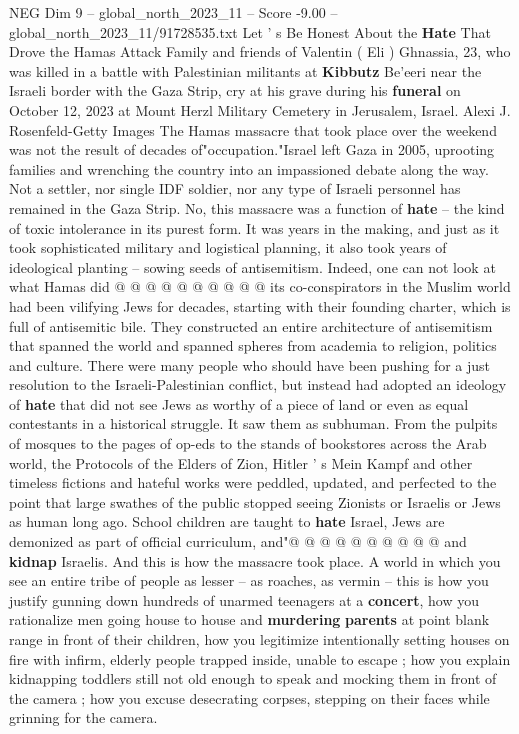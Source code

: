 \begin{textsample}{NEG Dim 9 – global\_north\_2023\_11 – Score -9.00 – global\_north\_2023\_11/91728535.txt}  \label{ex:f9_neg_068}
Let ' s Be Honest About the \textbf{Hate} That Drove the Hamas Attack Family and friends of Valentin ( Eli ) Ghnassia, 23, who was killed in a battle with Palestinian militants at \textbf{Kibbutz} Be'eeri near the Israeli border with the Gaza Strip, cry at his grave during his \textbf{funeral} on October 12, 2023 at Mount Herzl Military Cemetery in Jerusalem, Israel.
Alexi J.
Rosenfeld-Getty Images The Hamas massacre that took place over the weekend was not the result of decades of"occupation."Israel left Gaza in 2005, uprooting families and wrenching the country into an impassioned debate along the way.
Not a settler, nor single IDF soldier, nor any type of Israeli personnel has remained in the Gaza Strip.
No, this massacre was a function of \textbf{hate} -- the kind of toxic intolerance in its purest form.
It was years in the making, and just as it took sophisticated military and logistical planning, it also took years of ideological planting -- sowing seeds of antisemitism.
Indeed, one can not look at what Hamas did @ @ @ @ @ @ @ @ @ @ its co-conspirators in the Muslim world had been vilifying Jews for decades, starting with their founding charter, which is full of antisemitic bile.
They constructed an entire architecture of antisemitism that spanned the world and spanned spheres from academia to religion, politics and culture.
There were many people who should have been pushing for a just resolution to the Israeli-Palestinian conflict, but instead had adopted an ideology of \textbf{hate} that did not see Jews as worthy of a piece of land or even as equal contestants in a historical struggle.
It saw them as subhuman.
From the pulpits of mosques to the pages of op-eds to the stands of bookstores across the Arab world, the Protocols of the Elders of Zion, Hitler ' s Mein Kampf and other timeless fictions and hateful works were peddled, updated, and perfected to the point that large swathes of the public stopped seeing Zionists or Israelis or Jews as human long ago.
School children are taught to \textbf{hate} Israel, Jews are demonized as part of official curriculum, and"@ @ @ @ @ @ @ @ @ @ and \textbf{kidnap} Israelis.
And this is how the massacre took place.
A world in which you see an entire tribe of people as lesser -- as roaches, as vermin -- this is how you justify gunning down hundreds of unarmed teenagers at a \textbf{concert}, how you rationalize men going house to house and \textbf{murdering} \textbf{parents} at point blank range in front of their children, how you legitimize intentionally setting houses on fire with infirm, elderly people trapped inside, unable to escape ; how you explain kidnapping toddlers still not old enough to speak and mocking them in front of the camera ; how you excuse desecrating corpses, stepping on their faces while grinning for the camera.

\end{textsample}
